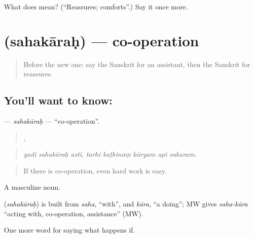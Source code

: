 \begin{tcolorbox}[breakable,colback=teal!4,colframe=teal!35!black,title={Before you move on}]
What does  mean? (\textquotedblleft{}Reassures; comforts\textquotedblright{}.) Say it once more.
\end{tcolorbox}
\section[\texorpdfstring{\sk{सहकारः} (sahakāraḥ)}{सहकारः (sahakāraḥ)}]{ (sahakāraḥ) — co-operation}

\label{lesson:SA-C392-sahakarah}



\begin{quote}
Before the new one: say the Sanskrit for an assistant, then the Sanskrit for reassures.
\end{quote}

\subsection*{You'll want to know: }
\textbf{} — \emph{sahakāraḥ} — \textquotedblleft{}co-operation\textquotedblright{}.

\begin{quote}
  ,     
\end{quote}

\begin{quote}
\emph{yadi sahakāraḥ asti, tarhi kaṭhinaṃ kāryam api sukaram.}
\end{quote}

\begin{quote}
If there is co-operation, even hard work is easy.
\end{quote}

A masculine noun.

\begin{cousinweb}
\textbf{} (\emph{sahakāraḥ}) is built from \emph{saha}, \textquotedblleft{}with\textquotedblright{}, and \emph{kāra}, \textquotedblleft{}a doing\textquotedblright{}; MW gives \emph{saha-kāra} \textquotedblleft{}acting with, co-operation, assistance\textquotedblright{} (MW).
\end{cousinweb}

\begin{grammarlens}[title={What you've built}]
One more word for saying what happens if.
\end{grammarlens}


